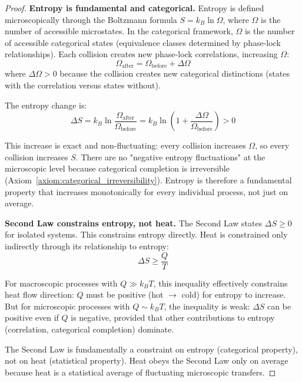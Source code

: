 \documentclass[12pt,a4paper]{article}
\theoremstyle{definition}
\theoremstyle{remark}
\begin{document}
\begin{proof}
\textbf{Entropy is fundamental and categorical.}
Entropy is defined microscopically through the Boltzmann formula $S = k_B \ln \Omega$, where $\Omega$ is the number of accessible microstates. In the categorical framework, $\Omega$ is the number of accessible categorical states (equivalence classes determined by phase-lock relationships). Each collision creates new phase-lock correlations, increasing $\Omega$:
\begin{equation}
\Omega_{\text{after}} = \Omega_{\text{before}} + \Delta \Omega
\end{equation}
where $\Delta \Omega > 0$ because the collision creates new categorical distinctions (states with the correlation versus states without).

The entropy change is:
\begin{equation}
\Delta S = k_B \ln \frac{\Omega_{\text{after}}}{\Omega_{\text{before}}} = k_B \ln \left(1 + \frac{\Delta \Omega}{\Omega_{\text{before}}}\right) > 0
\end{equation}

This increase is exact and non-fluctuating: every collision increases $\Omega$, so every collision increases $S$. There are no "negative entropy fluctuations" at the microscopic level because categorical completion is irreversible (Axiom~\ref{axiom:categorical_irreversibility}). Entropy is therefore a fundamental property that increases monotonically for every individual process, not just on average.

\textbf{Second Law constrains entropy, not heat.}
The Second Law states $\Delta S \geq 0$ for isolated systems. This constrains entropy directly. Heat is constrained only indirectly through its relationship to entropy:
\begin{equation}
\Delta S \geq \frac{Q}{T}
\end{equation}

For macroscopic processes with $Q \gg k_B T$, this inequality effectively constrains heat flow direction: $Q$ must be positive (hot $\to$ cold) for entropy to increase. But for microscopic processes with $Q \sim k_B T$, the inequality is weak: $\Delta S$ can be positive even if $Q$ is negative, provided that other contributions to entropy (correlation, categorical completion) dominate.

The Second Law is fundamentally a constraint on entropy (categorical property), not on heat (statistical property). Heat obeys the Second Law only on average because heat is a statistical average of fluctuating microscopic transfers.


\end{proof}
\end{document}
